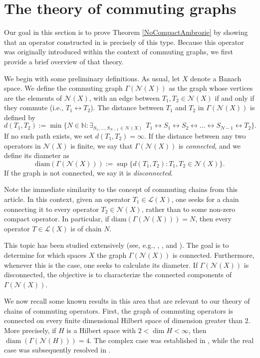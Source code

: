 \documentclass[a4paper,12pt]{article}
\theoremstyle{definition}
\numberwithin{equation}{section}
\numberwithin{thm}{section}
\newcommand{\N}{\mathbb{N}}
\begin{document}
\section{The theory of commuting graphs}
\label{sec:commuting_graphs}

Our goal in this section is to prove Theorem \ref{NoCompactAmbrozie} by showing that an operator constructed in \cite{Ambrozie} is precisely of this type. Because this operator was originally introduced within the context of commuting graphs, we first provide a brief overview of that theory.

We begin with some preliminary definitions. As usual, let $X$ denote a Banach space. We define the commuting graph $\Gamma(\mathcal{N}(X))$ as the graph whose vertices are the elements of $\mathcal{N}(X)$, with an edge between $T_1,T_2\in \mathcal{N}(X)$ if and only if they commute (i.e., $T_1 \leftrightarrow T_2$). The distance between $T_1$ and $T_2$ in $\Gamma(\mathcal{N}(X))$ is defined by
$$d(T_1,T_2) := \min\{N\in\N: \exists_{S_1,\dots,S_{N-1} \in \mathcal{N}(X)}~~T_1\leftrightarrow S_1\leftrightarrow S_2\leftrightarrow \dots\leftrightarrow S_{N-1}\leftrightarrow T_2\}.$$
If no such path exists, we set $d(T_1,T_2)=\infty$. If the distance between any two operators in $\mathcal{N}(X)$ is finite, we say that $\Gamma(\mathcal{N}(X))$ is \textit{connected}, and we define its diameter as 
$$\text{diam}(\Gamma(\mathcal{N}(X))) := \sup\{d(T_1,T_2) : T_1,T_2\in \mathcal{N}(X)\}.$$ 
If the graph is not connected, we say it is \textit{disconnected}.

Note the immediate similarity to the concept of commuting chains from this article. In this context, given an operator $T_1\in \mathcal{L}(X)$, one seeks for a chain connecting it to every operator $T_2\in \mathcal{N}(X)$, rather than to some non-zero compact operator. In particular, if $\text{diam}(\Gamma(\mathcal{N}(X)))=N$, then every operator $T\in \mathcal{L}(X)$ is of chain $N$. 

This topic has been studied extensively (see, e.g., \cite{Ambrozie}, \cite{Kuzma2}, \cite{Kuzma3} and \cite{Radjavi}). The goal is to determine for which spaces $X$ the graph $\Gamma(\mathcal{N}(X))$ is connected. Furthermore, whenever this is the case, one seeks to calculate its diameter. If $\Gamma(\mathcal{N}(X))$ is disconnected, the objective is to characterize the connected components of $\Gamma(\mathcal{N}(X))$. 

We now recall some known results in this area that are relevant to our theory of chains of commuting operators. First, the graph of commuting operators is connected on every finite dimensional Hilbert space of dimension greater than $2$. More precisely, if $H$ is a Hilbert space with $2<\dim H<\infty$, then $\operatorname{diam}(\Gamma(\mathcal{N}(H)))=4.$ The complex case was established in \cite[Corollary 7]{Radjavi}, while the real case was subsequently resolved in \cite{Miguel2013,Grau2017}.
\end{document}
